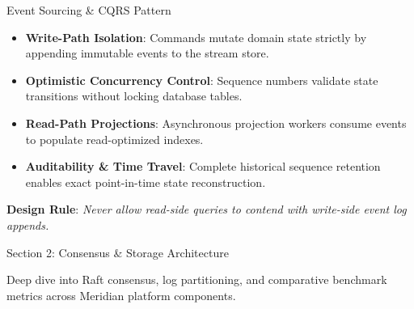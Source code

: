 \documentclass[
  style=simple,
  size=11pt,
  paper=screen,
  orient=landscape
]{powerdot}
\begin{document}
\begin{slide}{Event Sourcing \& CQRS Pattern}
\begin{itemize}
  \item \textbf{Write-Path Isolation}: Commands mutate domain state strictly by appending immutable events to the stream store.
  \item \textbf{Optimistic Concurrency Control}: Sequence numbers validate state transitions without locking database tables.
  \item \textbf{Read-Path Projections}: Asynchronous projection workers consume events to populate read-optimized indexes.
  \item \textbf{Auditability \& Time Travel}: Complete historical sequence retention enables exact point-in-time state reconstruction.
\end{itemize}

\vspace{0.5em}
\begin{tcolorbox}[cardbox]
\centering
\small \textbf{Design Rule}: \textit{Never allow read-side queries to contend with write-side event log appends.}
\end{tcolorbox}
\end{slide}

\begin{wideslide}{Section 2: Consensus \& Storage Architecture}
\vspace{1.5em}
\begin{tcolorbox}[monobox,title=Storage Engine Architecture]
Deep dive into Raft consensus, log partitioning, and comparative benchmark metrics across Meridian platform components.
\end{tcolorbox}
\end{wideslide}
\end{document}
